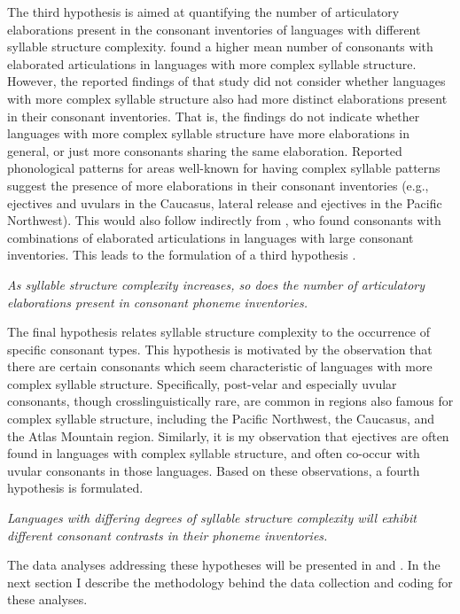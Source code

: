  The third hypothesis is aimed at quantifying the number of articulatory elaborations present in the consonant inventories of languages with different syllable structure complexity. \citet{MaddiesonEtAl2013} found a higher mean number of consonants with elaborated articulations in languages with more complex syllable structure. However, the reported findings of that study did not consider whether languages with more complex syllable structure also had more distinct elaborations present in their consonant inventories. That is, the findings do not indicate whether languages with more complex syllable structure have more elaborations in general, or just more consonants sharing the same elaboration. Reported phonological patterns for areas well-known for having complex syllable patterns suggest the presence of more elaborations in their consonant inventories (e.g., ejectives and uvulars in the Caucasus, lateral release and ejectives in the Pacific Northwest). This would also follow indirectly from \citet{LindblomMaddieson1988}, who found consonants with combinations of elaborated articulations in languages with large consonant inventories. This leads to the formulation of a third hypothesis .

\ea\label{ex:4.4}
  \textit{As syllable structure complexity increases, so does the number of articulatory elaborations present in consonant phoneme inventories.}
\z

  The final hypothesis relates syllable structure complexity to the occurrence of specific consonant types. This hypothesis is motivated by the observation that there are certain consonants which seem characteristic of languages with more complex syllable structure. Specifically, post-velar and especially uvular consonants, though crosslinguistically rare, are common in regions also famous for complex syllable structure, including the Pacific Northwest, the Caucasus, and the Atlas Mountain region. Similarly, it is my observation that ejectives are often found in languages with complex syllable structure, and often co-occur with uvular consonants in those languages. Based on these observations, a fourth hypothesis is formulated.

\ea\label{ex:4.5}
  \textit{Languages with differing degrees of syllable structure complexity will exhibit different consonant contrasts in their phoneme inventories.}
\z

  The data analyses addressing these hypotheses will be presented in  and . In the next section I describe the methodology behind the data collection and coding for these analyses.

